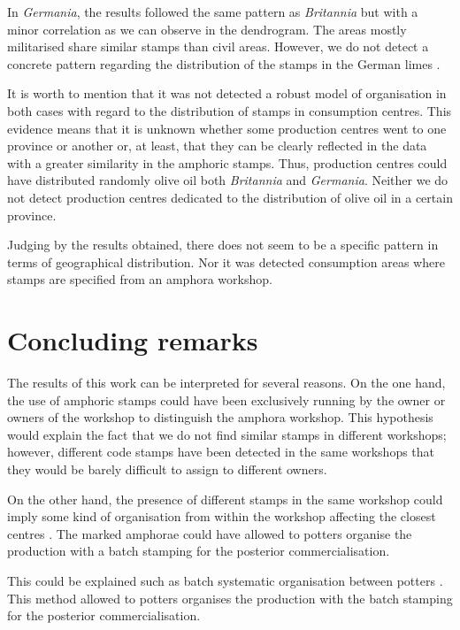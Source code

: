 \documentclass[review]{elsarticle}
\begin{document}
In \textit{Germania}, the results followed the same pattern as \textit{Britannia} but with a minor correlation as we can observe in the dendrogram. The areas mostly militarised share similar stamps than civil areas. However, we do not detect a concrete pattern regarding the distribution of the stamps in the German limes \citep{xanten2018}. 

It is worth to mention that it was not detected a robust model of organisation in both cases with regard to the distribution of stamps in consumption centres. This evidence means that it is unknown whether some production centres went to one province or another or, at least, that they can be clearly reflected in the data with a greater similarity in the amphoric stamps. Thus, production centres could have distributed randomly olive oil both \textit{Britannia} and \textit{Germania}. Neither we do not detect production centres dedicated to the distribution of olive oil in a certain province. 


Judging by the results obtained, there does not seem to be a specific pattern in terms of geographical distribution. Nor it was detected consumption areas where stamps are specified from an amphora workshop. 


\section{Concluding remarks}


The results of this work can be interpreted for several reasons. On the one hand, the use of amphoric stamps could have been exclusively running by the owner or owners of the workshop to distinguish the amphora workshop. This hypothesis would explain the fact that we do not find similar stamps in different workshops; however, different code stamps have been detected in the same workshops that they would be barely difficult to assign to different owners.

On the other hand, the presence of different stamps in the same workshop could imply some kind of organisation from within the workshop affecting the closest centres \citep{juanmorostesis}. The marked amphorae could have allowed to potters organise the production with a batch stamping for the posterior commercialisation.  

This could be explained such as batch systematic organisation between potters \citep{juanmorostesis}. 
This method allowed to potters organises the production with the batch stamping for the posterior commercialisation.
\end{document}
